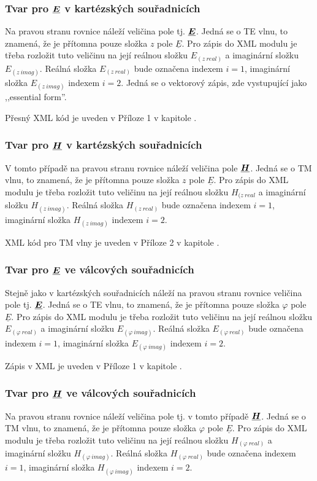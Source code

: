 \documentclass[12pt,a4paper,oneside]{article}
\numberwithin{equation}{section} %
\numberwithin{figure}{section} %
\numberwithin{table}{section} %
\renewcommand{\vec}[1]{\mbox{\boldmath$#1$}} %
\newcommand{\faz}[1]{{\underline{#1}}} %
\begin{document}
\subsubsection*{Tvar pro $\faz{\vec{E}}$ v kartézských souřadnicích}
Na pravou stranu rovnice náleží veličina pole tj. $\faz{\vec{E}}$. Jedná se o TE vlnu, to znamená, že je přítomna pouze složka $z$ pole $\faz{E}$. Pro zápis do XML modulu je třeba rozložit tuto veličinu na její reálnou složku $E _{(z ~ real)}$ a imaginární složku $E _{(z ~ imag)}$. Reálná složka $E _{(z ~ real)}$ bude označena indexem $i = 1$, imaginární složka $E _{(z ~ imag)}$ indexem $i = 2$. Jedná se o vektorový zápis, zde vystupující jako ,,essential form''.

Přesný XML kód je uveden v Příloze 1 v kapitole .

\subsubsection*{Tvar pro $\faz{\vec{H}}$ v kartézských souřadnicích}
V tomto případě na pravou stranu rovnice náleží veličina pole $\faz{\vec{H}}$. Jedná se o TM vlnu, to znamená, že je přítomna pouze složka $z$ pole $\faz{E}$. Pro zápis do XML modulu je třeba rozložit tuto veličinu na její reálnou složku $H _{(z ~ real}$ a imaginární složku $H _{(z ~ imag)}$. Reálná složka $H _{(z ~ real)}$ bude označena indexem $i = 1$, imaginární složka $H _{(z ~ imag)}$ indexem $i = 2$.

XML kód pro TM vlny je uveden v Příloze 2 v kapitole .

\subsubsection*{Tvar pro $\faz{\vec{E}}$ ve válcových souřadnicích}
Stejně jako v kartézských souřadnicích náleží na pravou stranu rovnice veličina pole tj. $\faz{\vec{E}}$. Jedná se o TE vlnu, to znamená, že je přítomna pouze složka $\varphi$ pole $\faz{E}$. Pro zápis do XML modulu je třeba rozložit tuto veličinu na její reálnou složku $E _{(\varphi ~ real)}$ a imaginární složku $E _{(\varphi ~ imag)}$. Reálná složka $E _{(\varphi ~ real)}$ bude označena indexem $i = 1$, imaginární složka $E _{(\varphi ~ imag)}$ indexem $i = 2$.

Zápis v XML je uveden v Příloze 1 v kapitole .

\subsubsection*{Tvar pro $\faz{\vec{H}}$ ve válcových souřadnicích}
Na pravou stranu rovnice náleží veličina pole tj. v tomto případě $\faz{\vec{H}}$. Jedná se o TM vlnu, to znamená, že je přítomna pouze složka $\varphi$ pole $\faz{E}$. Pro zápis do XML modulu je třeba rozložit tuto veličinu na její reálnou složku $H _{(\varphi ~ real)}$ a imaginární složku $H _{(\varphi ~ imag)}$. Reálná složka $H _{(\varphi ~ real)}$ bude označena indexem $i = 1$, imaginární složka $H _{(\varphi ~ imag)}$ indexem $i = 2$.
\end{document}
